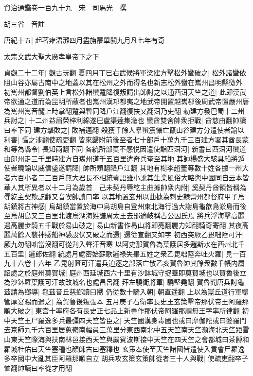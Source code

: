 資治通鑑卷一百九十九　宋　司馬光　撰

胡三省　音註

唐紀十五|{
	起著雍涒灘四月盡旃蒙單閼九月凡七年有奇}


太宗文武大聖大廣孝皇帝下之下

貞觀二十二年|{
	觀古玩翻}
夏四月丁巳右武候將軍梁建方擊松外蠻破之|{
	松外諸蠻依阻山谷亦屬古南中之地蓋以其在松州之外而得名也新志松外蠻在嶲州昌明縣徼外}
初嶲州都督劉伯英上言松外諸蠻蹔降復叛請出師討之以通西洱天竺之道|{
	此即漢武帝欲通之道而為昆明所蔽者也嶲州漢邛都夷之地武帝開置越嶲郡後周武帝置嚴州唐為嶲州嶲音髓上時掌翻蹔與暫同降戶江翻復扶又翻洱乃吏翻}
勑建方發巴蜀十二州兵討之|{
	十二州益眉榮梓利綿遂巴盧渠逹集渝也}
蠻酋雙舍帥衆拒戰|{
	酋慈由翻帥讀曰率下同}
建方擊敗之|{
	敗補邁翻}
殺獲千餘人羣蠻震懾亡竄山谷建方分遣使者諭以利害|{
	懾之涉翻使疏吏翻}
皆來歸附前後至者七十部戶十萬九千三百建方署其酋長蒙和等為縣令|{
	長知兩翻下同}
各統所部莫不感悦因遣使詣西洱河|{
	新書曰西洱河蠻道由郎州走三千里時建方自嶲州道千五百里遣奇兵奄至其地}
其帥楊盛大駭具船將遁使者曉諭以威信盛遂請降|{
	帥所類翻降戶江翻}
其地有楊李趙董等數十姓各據一州大者六百小者二三百戶無大君長不相統壹語雖小訛其生業風俗大略與中國同自云本皆華人其所異者以十二月為歲首　己未契丹辱紇主曲據帥衆内附|{
	奚契丹酋領皆稱為辱紇主契欺訖翻又音喫帥讀曰率}
以其地置玄州以曲據為刺史隸營州都督府甲子烏胡鎮將古神感|{
	烏胡鎮當置於海中烏胡島自登州東北海行過大謝島龜歆島淤島而後至烏胡島又三百里北渡烏湖海姓譜周太王去邠適岐稱古公因氏焉}
將兵浮海擊高麗遇高麗步騎五千戰於易山破之|{
	易山新書作曷山將即亮翻麗力知翻騎奇寄翻}
其夜高麗萬餘人襲神感船神感設伏又破之而還|{
	還從宣翻又如字}
初西突厥乙毘咄陸可汗|{
	厥九勿翻咄當沒翻可從刋入聲汗音寒}
以阿史那賀魯為葉護居多邏斯水在西州北千五百里|{
	邏郎佐翻}
統處月處密始蘇歌邏禄失畢五姓之衆乙毘咄陸奔吐火羅|{
	見一百九十六卷十六年}
乙毘射匱可汗遣兵迫逐之部落亡散乙亥賀魯帥其餘衆數千帳内屬詔處之於庭州莫賀城|{
	庭州西延城西六十里有沙鉢城守捉蓋即莫賀城也以賀魯後立為沙鉢羅葉護可汗故改城名也處昌呂翻}
拜左驍衛將軍|{
	驍堅堯翻}
賀魯聞唐兵討龜茲請為鄉導|{
	龜茲音丘慈鄉讀曰嚮}
仍從數十騎入朝|{
	朝直遥翻}
上以為崑丘道行軍總管厚宴賜而遣之|{
	為賀魯後叛張本}
五月庚子右衛率長史王玄策擊帝那伏帝王阿羅那順大破之|{
	東宫十率府各有長史正七品上新書作那伏帝阿羅那順無王字率所律翻}
初中天竺王尸羅逸多兵最彊四天竺皆臣之|{
	天竺國漢身毒國也或曰摩伽陀或曰婆羅門去京師九千六百里居蔥嶺南幅員三萬里分東西南北中五天竺南天竺瀕海北天竺距雪山東天竺際海與扶南林邑接西天竺與罽賓波斯接中天竺在四天竺之會都城曰茶餺和羅城杜佑曰天竺塞種也顔師古曰塞釋也}
玄策奉使至天竺諸國皆遣使入貢會尸羅逸多卒國中大亂其臣阿羅那順自立胡兵攻玄策玄策帥從者三十人與戰|{
	使疏吏翻卒子恤翻帥讀曰率從才用翻}
